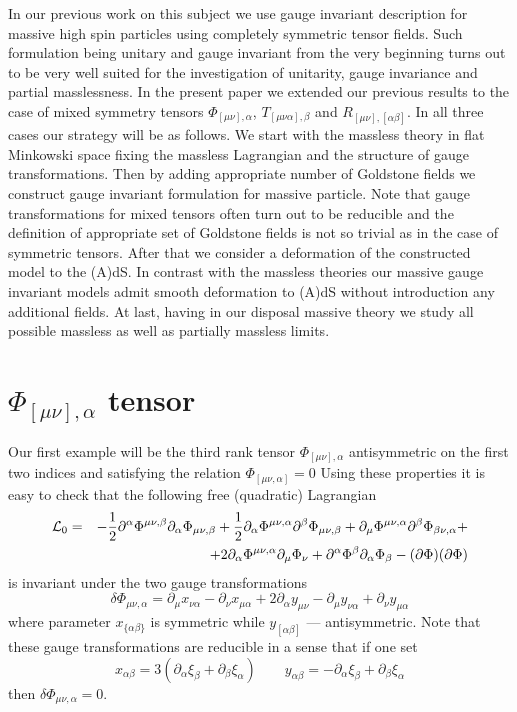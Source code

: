 \documentclass[a4paper,12pt]{article}
\begin{document}
In our previous work on this subject \cite{Zin01}  we use gauge invariant
description for massive high spin particles using completely symmetric
tensor fields. Such formulation being unitary and gauge invariant from
the very beginning turns out to be very well suited for the investigation of
unitarity, gauge invariance and partial masslessness. In the present
paper we extended our previous results to the case of mixed symmetry
tensors $\Phi_{[\mu\nu],\alpha}$, $T_{[\mu\nu\alpha],\beta}$ and
$R_{[\mu\nu],[\alpha\beta]}$. In all three cases our strategy will be
as follows. We start with the massless theory in flat Minkowski space
fixing the massless Lagrangian and the structure of gauge transformations.
Then by adding appropriate number of Goldstone fields we construct gauge
invariant formulation for massive particle. Note that gauge transformations
for mixed tensors often turn out to be reducible and the definition of
appropriate set of Goldstone fields is not so trivial as in the case of
symmetric tensors. After that we consider a deformation of the constructed
model to the (A)dS. In contrast with the massless theories our massive
gauge invariant models admit smooth deformation to (A)dS without
introduction any additional fields. At last, having in our disposal massive
theory we study all possible massless as well as partially massless
limits.

\section{$\Phi_{[\mu\nu],\alpha}$ tensor}

Our first example will be the third rank tensor $\Phi_{[\mu\nu],\alpha}$
antisymmetric on the first two indices and satisfying the relation
$\Phi_{[\mu\nu,\alpha]} = 0$ Using these properties it is easy to check
that the following free (quadratic) Lagrangian
\begin{eqnarray}
{\cal L}_0 &=& - \frac{1}{2} \partial^\alpha \Phi^{\mu\nu,\beta}
\partial_\alpha \Phi_{\mu\nu,\beta} + \frac{1}{2} \partial_\alpha
\Phi^{\mu\nu,\alpha} \partial^\beta \Phi_{\mu\nu,\beta} +
\partial_\mu \Phi^{\mu\nu,\alpha} \partial^\beta \Phi_{\beta\nu,\alpha}
+ \nonumber \\
 && + 2 \partial_\alpha \Phi^{\mu\nu,\alpha} \partial_\mu \Phi_\nu +
\partial^\alpha \Phi^\beta \partial_\alpha \Phi_\beta -
(\partial \Phi) (\partial \Phi)
\end{eqnarray}
is invariant under the two gauge transformations
\begin{equation}
\delta \Phi_{\mu\nu,\alpha} = \partial_\mu x_{\nu\alpha} - \partial_\nu
x_{\mu\alpha} + 2 \partial_\alpha y_{\mu\nu} - \partial_\mu y_{\nu\alpha}
+ \partial_\nu y_{\mu\alpha}
\end{equation}
where parameter $x_{\{\alpha\beta\}}$ is symmetric while $y_{[\alpha\beta]}$
--- antisymmetric. Note that these gauge transformations are reducible
in a sense that if one set
\begin{equation}
x_{\alpha\beta} = 3 (\partial_\alpha \xi_\beta + \partial_\beta \xi_\alpha)
\qquad y_{\alpha\beta} = - \partial_\alpha \xi_\beta + \partial_\beta \xi_\alpha
\end{equation}
then $\delta \Phi_{\mu\nu,\alpha} = 0$.
\end{document}
